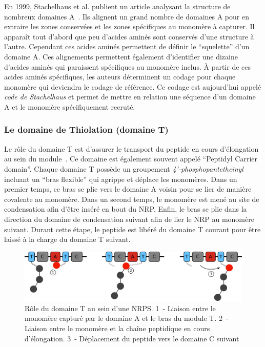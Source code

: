 En 1999, Stachelhaus et al. publient un article analysant la structure de nombreux domaines A~\cite{stachelhaus_specificity-conferring_1999}.
Ils alignent un grand nombre de domaines A pour en extraire les zones conservées et les zones spécifiques au monomère à capturer.
Il apparaît tout d'abord que peu d'acides aminés sont conservés d'une structure à l'autre.
Cependant ces acides aminés permettent de définir le ``squelette'' d'un domaine A.
Ces alignements permettent également d'identifier une dizaine d'acides aminés qui paraissent spécifiques au monomère inclus.
À partir de ces acides aminés spécifiques, les auteurs déterminent un codage pour chaque monomère qui deviendra le codage de référence.
Ce codage est aujourd'hui appelé \textit{code de Stachelhaus} et permet de mettre en relation une séquence d'un domaine A et le monomère spécifiquement recruté.


\subsubsection{Le domaine de Thiolation (domaine T)}

Le rôle du domaine T est d'assurer le transport du peptide en cours d'élongation au sein du module~\cite{stachelhaus_biochemical_1996,calcott_portability_2015}.
Ce domaine est également souvent appelé ``Peptidyl Carrier domain''.
Chaque domaine T possède un groupement \textit{4’-phosphopantetheinyl} incluant un ``bras flexible'' qui agrippe et déplace les monomères.
Dans un premier temps, ce bras se plie vers le domaine A voisin pour se lier de manière covalente au monomère.
Dans un second temps, le monomère est mené au site de condensation afin d'être inséré en bout du NRP.
Enfin, le bras se plie dans la direction du domaine de condensation suivant afin de lier le NRP au monomère suivant.
Durant cette étape, le peptide est libéré du domaine T courant pour être laissé à la charge du domaine T suivant.

\begin{figure}[h!]
  \begin{center}
    \includegraphics[width=450px]{Figures/bio/Intro/T-domain.png}
    \caption{\label{T_domain}Rôle du domaine T au sein d'une NRPS.
    1~- Liaison entre le monomère capturé par le domaine A et le bras du module T.
    2~- Liaison entre le monomère et la chaîne peptidique en cours d'élongation.
    3~- Déplacement du peptide vers le domaine C suivant}
  \end{center}
\end{figure}


